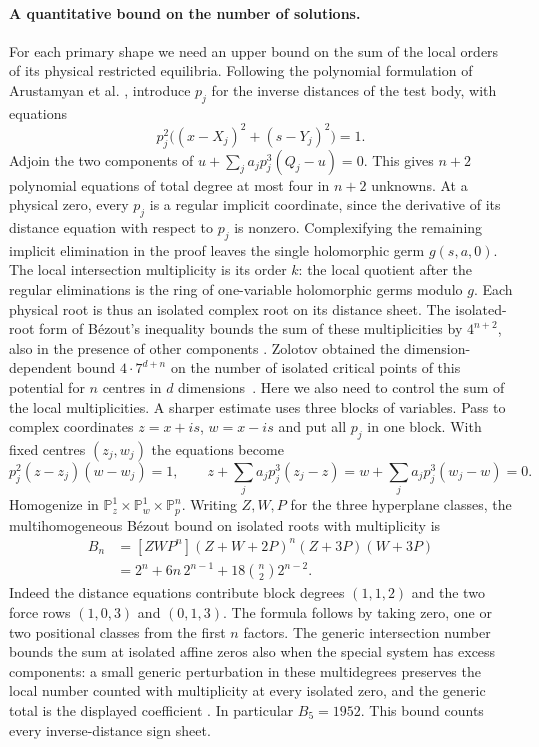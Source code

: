 \documentclass[11pt]{article}
\begin{document}
\paragraph{A quantitative bound on the number of solutions.}
For each primary shape we need an upper bound on the sum of the local orders of its physical restricted equilibria. Following the polynomial formulation of Arustamyan et al. \cite{arust}, introduce $p_j$ for the inverse distances of the test body, with equations
\[
 p_j^2\big((x-X_j)^2+(s-Y_j)^2\big)=1.
\]
Adjoin the two components of $u+\sum_j a_jp_j^3(Q_j-u)=0$. This gives $n+2$ polynomial equations of total degree at most four in $n+2$ unknowns. At a physical zero, every $p_j$ is a regular implicit coordinate, since the derivative of its distance equation with respect to $p_j$ is nonzero. Complexifying the remaining implicit elimination in the proof leaves the single holomorphic germ $g(s,a,0)$. The local intersection multiplicity is its order $k$: the local quotient after the regular eliminations is the ring of one-variable holomorphic germs modulo $g$. Each physical root is thus an isolated complex root on its distance sheet. The isolated-root form of B\'ezout's inequality bounds the sum of these multiplicities by $4^{n+2}$, also in the presence of other components \cite[Theorem 3]{bezout}. 
Zolotov obtained the dimension-dependent bound $4\cdot7^{d+n}$ on the number of isolated critical points of this potential for $n$ centres in $d$ dimensions~\cite[Thm.~4]{zolotov}. Here we also need to control the sum of the local multiplicities. A sharper estimate uses three blocks of variables. Pass to complex coordinates
$z=x+is$, $w=x-is$ and put all $p_j$ in one block. With fixed centres $(z_j,w_j)$ the equations become
\[
 p_j^2(z-z_j)(w-w_j)=1,\qquad
 z+\sum_j a_j p_j^3(z_j-z)=w+\sum_j a_j p_j^3(w_j-w)=0 .
\]
Homogenize in $\mathbb P^1_z\times\mathbb P^1_w\times\mathbb P^n_p$.
Writing $Z,W,P$ for the three hyperplane classes, the multihomogeneous B\'ezout bound on isolated roots with multiplicity is
\begin{align*}
 B_n&=[ZWP^n](Z+W+2P)^n(Z+3P)(W+3P)\\
    &=2^n+6n\,2^{n-1}+18\binom n2 2^{n-2}.
\end{align*}
Indeed the distance equations contribute block degrees $(1,1,2)$ and the two force rows $(1,0,3)$ and $(0,1,3)$. The formula follows by taking zero, one or two positional classes from the first $n$ factors. The generic intersection number bounds the sum at isolated affine zeros also when the special system has excess components: a small generic perturbation in these multidegrees preserves the local number counted with multiplicity at every isolated zero, and the generic total is the displayed coefficient \cite{multi}. In particular $B_5=1952$. This bound counts every inverse-distance sign sheet.
\end{document}
